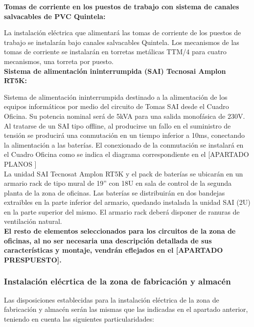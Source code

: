 {\bfseries Tomas de corriente en los puestos de trabajo con sistema de canales salvacables de PVC Quintela:}

La instalación eléctrica que alimentará las tomas de corriente de los puestos de trabajo se instalarán bajo canales salvacables Quintela. Los mecanismos de las tomas de corriente se instalarán en torretas metálicas TTM/4 para cuatro mecanismos, una torreta por puesto.\\

{\bfseries Sistema de alimentación ininterrumpida (SAI) Tecnosai Amplon RT5K:}

Sistema de alimentación ininterrumpida destinado a la alimentación de los equipos informáticos por medio del circuito de Tomas SAI desde el Cuadro Oficina. Su potencia nominal será de 5kVA para una salida monofásica de 230V.\\ 

Al tratarse de un SAI tipo offline, al producirse un fallo en el suministro de tensión se producirá una conmutación en un tiempo inferior a 10ms, conectando la alimentación a las baterías. El conexionado de la conmutación se instalará en el Cuadro Oficina como se indica el diagrama correspondiente en el [APARTADO PLANOS ]\\

La unidad SAI Tecnosat Amplon RT5K y el pack de baterías se ubicarán en un armario rack de tipo mural de 19'' con 18U en sala de control de la segunda planta de la zona de oficinas. Las baterías se distribuirán en dos bandejas extraibles en la parte inferior del armario, quedando instalada la unidad SAI (2U) en la parte superior del mismo. El armario rack deberá disponer de ranuras de ventilación natural.\\



{\bfseries El resto de elementos seleccionados para los circuitos de la zona de oficinas, al no ser necesaria una descripción detallada de sus características y montaje, vendrán eflejados en el [APARTADO PRESPUESTO].}

\subsubsection{Instalación elécrtica de la zona de fabricación y almacén}

Las disposiciones establecidas para la instalación eléctrica de la zona de fabricación y almacén serán las mismas que las indicadas en el apartado anterior, teniendo en cuenta las siguientes particularidades:\\

